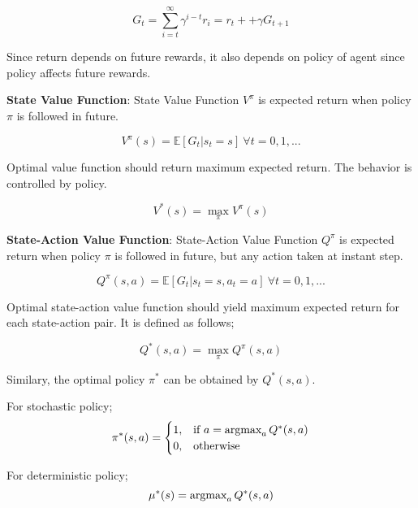 \begin{equation}
G_t = \sum_{i=t}^{\infty} \gamma^{i-t} r_i = r_t + + \gamma G_{t+1}
\end{equation}

Since return depends on future rewards, it also depends on policy of agent since policy affects future rewards.

\textbf{State Value Function}: State Value Function $V^{\pi}$ is expected return when policy $\pi$ is followed in future.

\begin{equation}
V^{\pi}(s) = \mathbb{E}[G_t|s_t=s] \: \forall t = 0,1, ...
\end{equation}

Optimal value function should return maximum expected return. The behavior is controlled by policy.

\begin{equation}
V^{*}(s) = \max_{\pi} V^{\pi}(s)
\end{equation}

\textbf{State-Action Value Function}: State-Action Value Function $Q^{\pi}$ is expected return when policy $\pi$ is followed in future, but any action taken at instant step.

\begin{equation}
Q^{\pi}(s,a) = \mathbb{E}[G_t|s_t=s, a_t=a] \: \forall t = 0,1, ...
\end{equation}

Optimal state-action value function should yield maximum expected return for each state-action pair. It is defined as follows;

\begin{equation}
Q^{*}(s,a) = \max_{\pi} Q^{\pi}(s,a)
\end{equation}

Similary, the optimal policy $\pi^*$ can be obtained by $Q^{*}(s,a)$.

For stochastic policy;
\begin{equation}
\label{eqn:policy_stochastic_q}
\pi^{*}(s,a) = 
\begin{cases}
1,   & \text{if  } a = \operatorname{\textup{argmax}}_{a} Q^{*}(s,a) \\
0,   & \text{otherwise  }
\end{cases} 
\end{equation}

For deterministic policy;
\begin{equation}
\label{eqn:policy_deterministic_q}
\mu^{*}(s) = \operatorname{\textup{argmax}}_{a} Q^{*}(s,a)
\end{equation}

